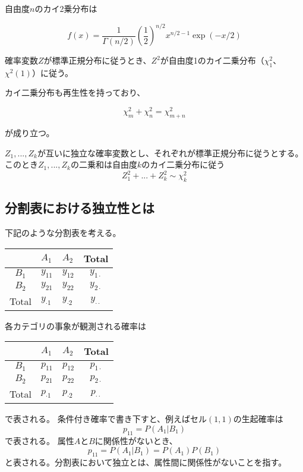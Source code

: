 \documentclass[10pt, a4paper]{ltjsarticle}
\begin{document}
自由度$n$のカイ2乗分布は

\begin{equation}
  f(x) = \frac{1}{\Gamma(n/2)}\left(\frac{1}{2}\right)^{n/2}x^{n/2-1}\exp({-x/2})
\end{equation}

確率変数$Z$が標準正規分布に従うとき、$Z^2$が自由度1のカイ二乗分布（$\chi^2_1$、$\chi^2(1)$）に従う。

カイ二乗分布も再生性を持っており、

\begin{equation}
  \chi^2_m + \chi^2_n = \chi^2_{m+n}
\end{equation}

が成り立つ。

$Z_1,...,Z_k$が互いに独立な確率変数とし、それぞれが標準正規分布に従うとする。このとき$Z_1,...,Z_k$の二乗和は自由度$k$のカイ二乗分布に従う
\begin{equation}
  Z_1^2+...+Z_k^2 \sim \chi^2_k
\end{equation}



\subsection{分割表における独立性とは}

下記のような分割表を考える。

\begin{table}[h]
  \centering
  \begin{tabular}{c|ll|c}
   &  $A_1$ & $A_2$ & Total \\ \hline
 $B_1$  & $y_{11}$ & $y_{12}$  & $y_{1\cdot}$ \\
 $B_2$  & $y_{21}$ & $y_{22}$  & $y_{2\cdot}$ \\ \hline
 Total  & $y_{\cdot 1}$ & $y_{\cdot 2}$ & $y_{\cdot\cdot}$ 
  \end{tabular}
\end{table}

各カテゴリの事象が観測される確率は
\begin{table}[h]
  \centering
  \begin{tabular}{c|ll|c}
   &  $A_1$ & $A_2$ & Total \\ \hline
 $B_1$  & $p_{11}$ & $p_{12}$  & $p_{1\cdot}$ \\
 $B_2$  & $p_{21}$ & $p_{22}$  & $p_{2\cdot}$ \\ \hline
 Total  & $p_{\cdot 1}$ & $p_{\cdot 2}$ & $p_{\cdot\cdot}$ 
  \end{tabular}
\end{table}
で表される。
条件付き確率で書き下すと、例えばセル$(1,1)$の生起確率は
\begin{equation}
  p_{11} = P(A_1|B_1)
\end{equation}
で表される。 属性$A$と$B$に関係性がないとき、
\begin{equation}
  p_{11} = P(A_1|B_1) = P(A_1)P(B_1)
\end{equation}
と表される。分割表において独立とは、属性間に関係性がないことを指す。
\end{document}
